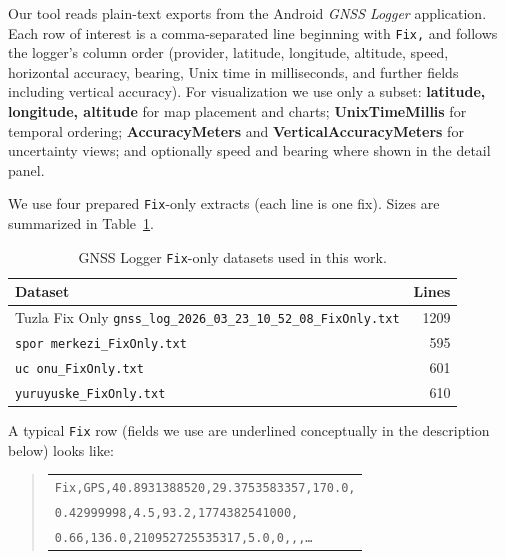\documentclass[conference]{IEEEtran}
\begin{document}
Our tool reads plain-text exports from the Android \textit{GNSS Logger} application. Each row of interest is a comma-separated line beginning with \texttt{Fix,} and follows the logger's column order (provider, latitude, longitude, altitude, speed, horizontal accuracy, bearing, Unix time in milliseconds, and further fields including vertical accuracy). For visualization we use only a subset: \textbf{latitude, longitude, altitude} for map placement and charts; \textbf{UnixTimeMillis} for temporal ordering; \textbf{AccuracyMeters} and \textbf{VerticalAccuracyMeters} for uncertainty views; and optionally speed and bearing where shown in the detail panel.

We use four prepared \texttt{Fix}-only extracts (each line is one fix). Sizes are summarized in Table~\ref{tab:fix_counts}.

\begin{table}[H]
    \centering
    \caption{GNSS Logger \texttt{Fix}-only datasets used in this work.}
    \label{tab:fix_counts}
    \small
    \setlength{\tabcolsep}{4pt}
    \begin{tabular}{@{} >{\raggedright\arraybackslash}p{} r @{}}
        \toprule
        \textbf{Dataset} & \textbf{Lines} \\
        \midrule
        Tuzla Fix Only\newline
        \scriptsize\texttt{gnss\_log\_2026\_03\_23\_10\_52\_08\_FixOnly.txt} & 1209 \\
        \texttt{spor merkezi\_FixOnly.txt} & 595 \\
        \texttt{uc onu\_FixOnly.txt} & 601 \\
        \texttt{yuruyuske\_FixOnly.txt} & 610 \\
        \bottomrule
    \end{tabular}
\end{table}

A typical \texttt{Fix} row (fields we use are underlined conceptually in the description below) looks like:

\begin{quote}
\footnotesize
\raggedright
\begin{tabular}{@{}l@{}}
\texttt{Fix,GPS,40.8931388520,29.3753583357,170.0,}\\
\texttt{0.42999998,4.5,93.2,1774382541000,}\\
\texttt{0.66,136.0,210952725535317,5.0,0,,,\ldots}
\end{tabular}
\end{quote}
\end{document}
